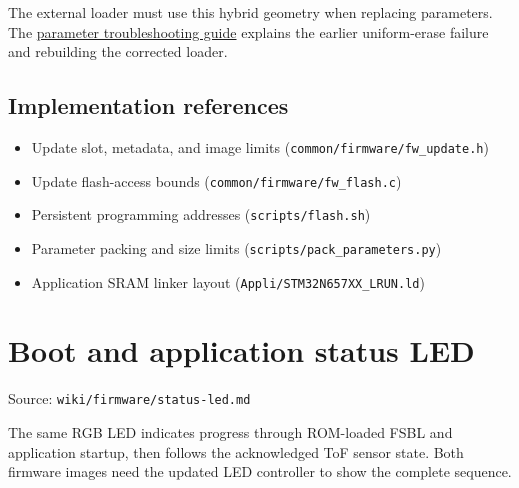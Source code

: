 \documentclass[10pt,a4paper,oneside]{report}
\providecommand{\tightlist}{\setlength{\itemsep}{1pt}\setlength{\parskip}{1pt}}
\begin{document}
The external loader must use this hybrid geometry when replacing parameters. The \hyperref[wiki-firmware-parameters--troubleshooting-parameter-programming]{parameter troubleshooting guide} explains the earlier uniform-erase failure and rebuilding the corrected loader.

\section{Implementation references}\label{wiki-hardware-flash-layout--implementation-references}

\begin{itemize}
\tightlist
\item
  {Update slot, metadata, and image limits (\nolinkurl{common/firmware/fw_update.h})}
\item
  {Update flash-access bounds (\nolinkurl{common/firmware/fw_flash.c})}
\item
  {Persistent programming addresses (\nolinkurl{scripts/flash.sh})}
\item
  {Parameter packing and size limits (\nolinkurl{scripts/pack_parameters.py})}
\item
  {Application SRAM linker layout (\nolinkurl{Appli/STM32N657XX_LRUN.ld})}
\end{itemize}

\chapter{Boot and application status LED}\label{wiki-firmware-status-led--boot-and-application-status-led}

{\small\color{MGSMuted}Source: \nolinkurl{wiki/firmware/status-led.md}\par}\medskip

The same RGB LED indicates progress through ROM-loaded FSBL and application startup, then follows the acknowledged ToF sensor state. Both firmware images need the updated LED controller to show the complete sequence.
\end{document}
